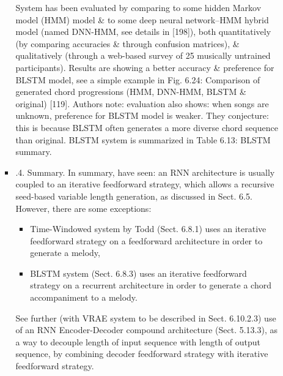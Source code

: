 \documentclass{article}
\begin{document}
\begin{itemize}
\begin{itemize}
\begin{itemize}
			System has been evaluated by comparing to some hidden Markov model (HMM) model \& to some deep neural network--HMM hybrid model (named DNN-HMM, see details in [198]), both quantitatively (by comparing accuracies \& through confusion matrices), \& qualitatively (through a web-based survey of 25 musically untrained participants). Results are showing a better accuracy \& preference for BLSTM model, see a simple example in {\sf Fig. 6.24: Comparison of generated chord progressions (HMM, DNN-HMM, BLSTM \& original) [119]}. Authors note: evaluation also shows: when songs are unknown, preference for BLSTM model is weaker. They conjecture: this is because BLSTM often generates a more diverse chord sequence than original. BLSTM system is summarized in {\sf Table 6.13: BLSTM summary}.
			\item {.4. Summary.} In summary, have seen: an RNN architecture is usually coupled to an iterative feedforward strategy, which allows a recursive seed-based variable length generation, as discussed in Sect. 6.5. However, there are some exceptions:
			\begin{itemize}
				\item Time-Windowed system by {\sc Todd} (Sect. 6.8.1) uses an iterative feedforward strategy on a feedforward architecture in order to generate a melody,
				\item BLSTM system (Sect. 6.8.3) uses an iterative feedforward strategy on a recurrent architecture in order to generate a chord accompaniment to a melody.
			\end{itemize}
			See further (with VRAE system to be described in Sect. 6.10.2.3) use of an RNN Encoder-Decoder compound architecture (Sect. 5.13.3), as a way to decouple length of input sequence with length of output sequence, by combining decoder feedforward strategy with iterative feedforward strategy.


\end{itemize}
\end{itemize}
\end{itemize}
\end{document}
